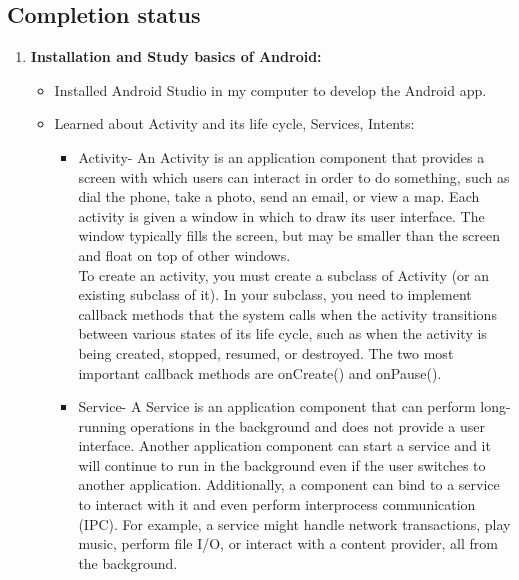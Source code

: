 \documentclass[a4paper,12pt,oneside]{book}
\begin{document}
\subsection*{Completion status}
\begin{enumerate}
	 	\item \textbf{\large Installation and Study basics of Android:}
	 	\begin{itemize}
			\item Installed Android Studio in my computer to develop the Android app.
			\item Learned about Activity and its life cycle, Services, Intents:
			\begin{itemize}
				\item Activity- An Activity is an application component that provides a screen with which users can interact in order to do something, such as dial the phone, take a photo, send an email, or view a map. Each activity is given a window in which to draw its user interface. The window typically fills the screen, but may be smaller than the screen and float on top of other windows.\\
				To create an activity, you must create a subclass of Activity (or an existing subclass of it). In your subclass, you need to implement callback methods that the system calls when the activity transitions between various states of its life cycle, such as when the activity is being created, stopped, resumed, or destroyed. The two most important callback methods are onCreate() and onPause().
				\item Service- A Service is an application component that can perform long-running operations in the background and does not provide a user interface. Another application component can start a service and it will continue to run in the background even if the user switches to another application. Additionally, a component can bind to a service to interact with it and even perform interprocess communication (IPC). For example, a service might handle network transactions, play music, perform file I/O, or interact with a content provider, all from the background.
				

\end{itemize}
\end{itemize}
\end{enumerate}
\end{document}
